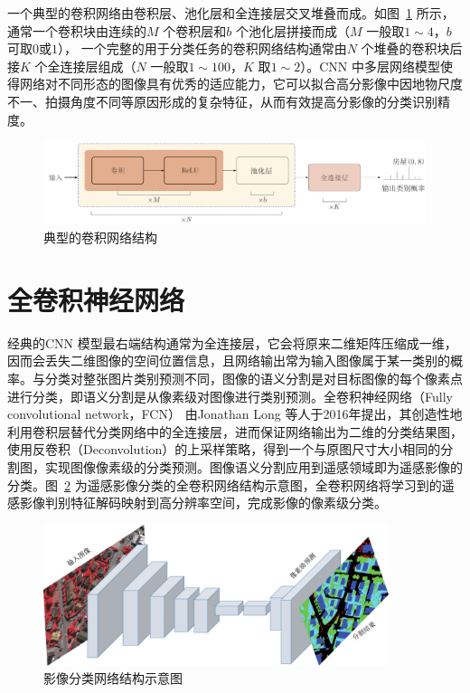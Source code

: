 一个典型的卷积网络由卷积层、池化层和全连接层交叉堆叠而成。如图~\ref{fig:cnn_structure} 所示，通常一个卷积块由连续的$M$ 个卷积层和$b$ 个池化层拼接而成（$M$ 一般取$1\sim 4$，$b$ 可取$0$或$1$）， 一个完整的用于分类任务的卷积网络结构通常由$N$ 个堆叠的卷积块后接$K$ 个全连接层组成（$N$ 一般取$1\sim 100$，$K$ 取$1 \sim 2$）。CNN 中多层网络模型使得网络对不同形态的图像具有优秀的适应能力，它可以拟合高分影像中因地物尺度不一、拍摄角度不同等原因形成的复杂特征，从而有效提高分影像的分类识别精度。

\begin{figure}[htb]
  \centering
  \includegraphics[width=1.0\textwidth]{figures/cnn_structure}
  \caption{典型的卷积网络结构}\label{fig:cnn_structure}
\end{figure}

\section{全卷积神经网络}
\label{ssec:chap02-2}
经典的CNN 模型最右端结构通常为全连接层，它会将原来二维矩阵压缩成一维，因而会丢失二维图像的空间位置信息，且网络输出常为输入图像属于某一类别的概率。与分类对整张图片类别预测不同，图像的语义分割是对目标图像的每个像素点进行分类，即语义分割是从像素级对图像进行类别预测。全卷积神经网络（Fully convolutional network，FCN）\cite{long2015fully} 由Jonathan Long 等人于2016年提出，其创造性地利用卷积层替代分类网络中的全连接层，进而保证网络输出为二维的分类结果图，使用反卷积（Deconvolution）的上采样策略，得到一个与原图尺寸大小相同的分割图，实现图像像素级的分类预测。图像语义分割应用到遥感领域即为遥感影像的分类。图~\ref{fig:fcn_structure} 为遥感影像分类的全卷积网络结构示意图，全卷积网络将学习到的遥感影像判别特征解码映射到高分辨率空间，完成影像的像素级分类。

\begin{figure}[htb]
  \centering
  \includegraphics[width=0.9\textwidth]{figures/FCN}
  \caption{影像分类网络结构示意图}\label{fig:fcn_structure}
\end{figure}

